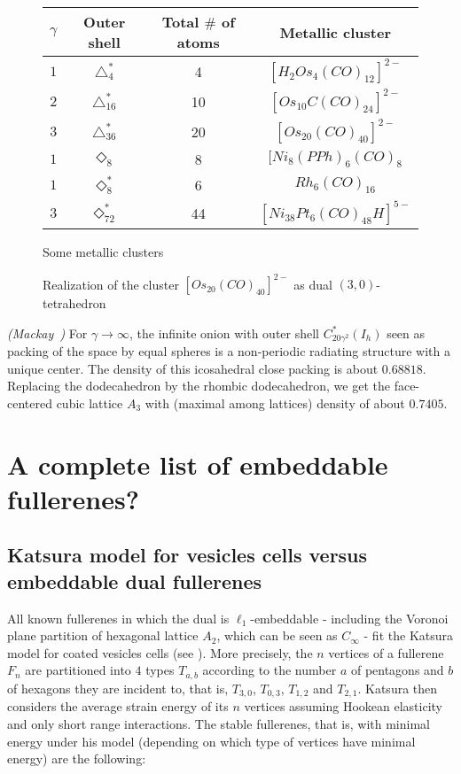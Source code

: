 \begin{figure}[htbp]
\begin{center}
\begin{tabular}{|c|c|c|c|} \hline
$\gamma$ & Outer shell & Total $\#$ of atoms & Metallic cluster \\ \hline \hline
$1$ & $\triangle^*_{4}$  &  4 & $[H_2Os_4(CO)_{12}]^{2-}$ \\  \hline
$2$ & $\triangle^*_{16}$ & 10 & $[Os_{10}C(CO)_{24}]^{2-}$ \\  \hline \hline
$3$ & $\triangle^*_{36}$ & 20 & $[Os_{20}(CO)_{40}]^{2-}$ \\  \hline \hline
$1$ & $\Diamond_{8}$  &  8  & $[Ni_8(PPh)_6(CO)_8$ \\  \hline \hline
$1$ & $\Diamond^*_{8}$  &  6  & $Rh_6(CO)_{16}$ \\  \hline
$3$ & $\Diamond^*_{72}$ & 44 & $[Ni_{38}Pt_6(CO)_{48}H]^{5-}$ \\  \hline
\end{tabular}
\caption{Some metallic clusters}\label{russia4}
\end{center}
\begin{center}
\caption{Realization of the cluster $[Os_{20}(CO)_{40}]^{2-}$ as dual $(3,0)$-tetrahedron}
\end{center}
\end{figure}

\begin{remark} {\em{\sc (Mackay~\cite{mck})}}
For $\gamma\to\infty$, the infinite onion with outer shell $C^*_{20\gamma^2}(I_h)$
seen as packing of the space by equal spheres is a non-periodic radiating structure
with a unique center. The density of this icosahedral close packing is about
$0.68818$. Replacing the dodecahedron by the rhombic dodecahedron, we get the
face-centered cubic lattice $A_3$ with (maximal among lattices) density of about $0.7405$.
\end{remark}

\newpage
\section{A complete list of embeddable fullerenes?}\label{katsura}
\subsection{ Katsura model for vesicles cells versus embeddable dual fullerenes}
All known fullerenes in which the dual is $\ell_1$-embeddable - including the 
Voronoi plane partition of hexagonal lattice
$A_2$, which can be seen as $C_{\infty}$ - fit the {\sc Katsura} model for coated vesicles cells
(see \cite{k83}). More precisely, the $n$ vertices of a fullerene $F_n$ are partitioned into
$4$ types $T_{a,b}$ according to the number $a$ of pentagons and $b$ of hexagons 
they are incident to, that is, $T_{3,0}$, $T_{0,3}$, $T_{1,2}$ and $T_{2,1}$.
{\sc Katsura} then considers the average strain energy of its $n$ vertices 
assuming Hookean elasticity and only short range interactions.  
The stable fullerenes, that is,  with minimal energy under his model
(depending on which type of vertices have minimal energy)
are the following:

